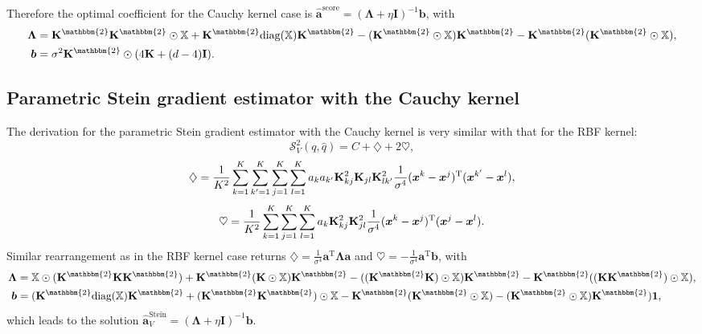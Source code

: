 Therefore the optimal coefficient for the Cauchy kernel case is $\hat{\bm{a}}^{\text{score}} = (\bm{\Lambda} + \eta \mathbf{I})^{-1} \bm{b}$, with
\begin{equation*}
\begin{aligned}
\bm{\Lambda} &= \K^{\mathbbm{2}} \K^{\mathbbm{2}} \odot \mathbb{X} + \K^{\mathbbm{2}} \text{diag}(\mathbb{X}) \K^{\mathbbm{2}} - (\K^{\mathbbm{2}} \odot \mathbb{X}) \K^{\mathbbm{2}} - \K^{\mathbbm{2}} (\K^{\mathbbm{2}} \odot \mathbb{X}), \\
\bm{b} &= \sigma^2 \K^{\mathbbm{2}} \odot (4 \K + (d - 4)\mathbf{I}).
\end{aligned}
\end{equation*}

\subsection{Parametric Stein gradient estimator with the Cauchy kernel}
The derivation for the parametric Stein gradient estimator with the Cauchy kernel is very similar with that for the RBF kernel:
\begin{equation*}
\mathcal{S}_{V}^2(q, \hat{q}) = C + \diamondsuit + 2 \heartsuit,
\end{equation*}
\begin{equation*}
\diamondsuit = \frac{1}{K^2} \sum_{k=1}^K \sum_{k'=1}^K \sum_{j=1}^K \sum_{l=1}^K a_k a_{k'} \mathbf{K}_{kj}^2 \mathbf{K}_{jl} \mathbf{K}_{lk'}^2 \frac{1}{\sigma^4} (\bm{x}^k - \bm{x}^j)^{\text{T}}(\bm{x}^{k'} - \bm{x}^l),
\end{equation*}
\begin{equation*}
\heartsuit = \frac{1}{K^2} \sum_{k=1}^K \sum_{j=1}^K \sum_{l=1}^K a_k \mathbf{K}_{kj}^2 \mathbf{K}_{jl}^2 \frac{1}{\sigma^4} (\bm{x}^k - \bm{x}^j)^{\text{T}} (\bm{x}^j - \bm{x}^l).
\end{equation*}
Similar rearrangement as in the RBF kernel case returns $\diamondsuit = \frac{1}{\sigma^4} \bm{a}^{\text{T}} \bm{\Lambda} \bm{a}$ and $\heartsuit = -\frac{1}{\sigma^4} \bm{a}^{\text{T}} \bm{b}$, with
\begin{equation*}
\begin{aligned}
\bm{\Lambda} &= \Xb \odot (\K^{\mathbbm{2}} \K \K^{\mathbbm{2}}) + \K^{\mathbbm{2}} (\K \odot \Xb) \K^{\mathbbm{2}} - ((\K^{\mathbbm{2}} \K) \odot \Xb) \K^{\mathbbm{2}} - \K^{\mathbbm{2}} ((\K \K^{\mathbbm{2}} ) \odot \Xb), \\
\bm{b} &= ( \K^{\mathbbm{2}} \text{diag}(\mathbb{X}) \K^{\mathbbm{2}} + (\K^{\mathbbm{2}} \K^{\mathbbm{2}}) \odot \mathbb{X} - \K^{\mathbbm{2}} (\K^{\mathbbm{2}} \odot \mathbb{X}) - (\K^{\mathbbm{2}} \odot \mathbb{X}) \K^{\mathbbm{2}} ) \bm{1},
\end{aligned}
\end{equation*}
which leads to the solution $\hat{\bm{a}}^{\text{Stein}}_V = (\bm{\Lambda} + \eta \mathbf{I})^{-1} \bm{b}$.

